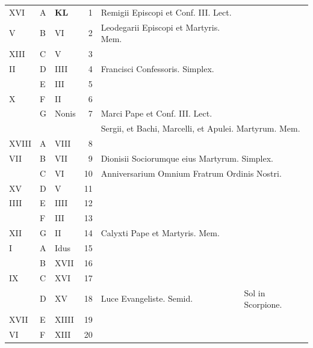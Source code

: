 \documentclass[11pt,openany]{book}
\begin{document}
\begin{center}
\begin{tabular}{l | l | l | r | l l}
\color{Red} XVI & \color{Red} A & \textbf{\color{Red} K\color{Blue}L} & 1 & \color{Red} Remigii Episcopi et Conf. III. Lect. \\
\color{Red} V & B & \color{Red} VI & 2 & \color{Red} Leodegarii Episcopi et Martyris. Mem. \\
\color{Red} XIII & C & \color{Red} V & 3 & & \color{Red} \\
\color{Red} II & D & \color{Red} IIII & 4 & Francisci Confessoris. Simplex. & \color{Red} \\
\color{Red}  & E & \color{Red} III & 5 & & \color{Red} \\
\color{Red} X & F & \color{Red} II & 6 & & \color{Red} \\
\color{Red}  & G & \color{Red} Nonis & 7 & Marci Pape et Conf. III. Lect. \\
 &  & & & \multicolumn{2}{l}{\qquad Sergii, et Bachi, Marcelli, et Apulei. Martyrum. Mem.} \\
\color{Red} XVIII & \color{Red} A & \color{Red} VIII & 8 & & \color{Red} \\
\color{Red} VII & B & \color{Red} VII & 9 & \multicolumn{2}{l}{\color{Red} Dionisii Sociorumque eius Martyrum. Simplex.} \\
\color{Red}  & C & \color{Red} VI & 10 & \multicolumn{2}{l}{\color{Red} Anniversarium Omnium Fratrum Ordinis Nostri.} \\
\color{Red} XV & D & \color{Red} V & 11 & & \color{Red} \\
\color{Red} IIII & E & \color{Red} IIII & 12 & & \color{Red} \\
\color{Red}  & F & \color{Red} III & 13 &  & \color{Red} \\
\color{Red} XII & G & \color{Red} II & 14 & Calyxti Pape et Martyris. Mem. & \color{Red} \\
\color{Red} I & \color{Red} A & \color{Red} Idus & 15 & & \color{Red} \\
\color{Red}  & B & \color{Red} XVII & 16 &  & \color{Red} \\
\color{Red} IX & C & \color{Red} XVI & 17 &  & \color{Red} \\
\color{Red}  & D & \color{Red} XV & 18 & Luce Evangeliste. Semid. & \color{Red} Sol in Scorpione. \\
\color{Red} XVII & E & \color{Red} XIIII & 19 & & \color{Red} \\
\color{Red} VI & F & \color{Red} XIII & 20 & & \color{Red} \\

\end{tabular}
\end{center}
\end{document}
